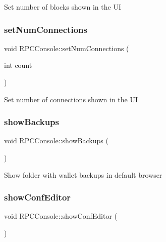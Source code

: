 Set number of blocks shown in the UI \mbox{\label{class_r_p_c_console_aa4546cb7812dd35704de8bf09a6ceb60}} 
\subsubsection{\texorpdfstring{set\+Num\+Connections}{setNumConnections}}
{\footnotesize\ttfamily void R\+P\+C\+Console\+::set\+Num\+Connections (\begin{DoxyParamCaption}\item[{int}]{count }\end{DoxyParamCaption})\hspace{0.3cm}{\ttfamily [slot]}}

Set number of connections shown in the UI \mbox{\label{class_r_p_c_console_a013ee20b746b6453375738e7b5e1cb4e}} 
\subsubsection{\texorpdfstring{show\+Backups}{showBackups}}
{\footnotesize\ttfamily void R\+P\+C\+Console\+::show\+Backups (\begin{DoxyParamCaption}{ }\end{DoxyParamCaption})\hspace{0.3cm}{\ttfamily [slot]}}

Show folder with wallet backups in default browser \mbox{\label{class_r_p_c_console_ab7e647de183fc0d139bac81ed0492667}} 
\subsubsection{\texorpdfstring{show\+Conf\+Editor}{showConfEditor}}
{\footnotesize\ttfamily void R\+P\+C\+Console\+::show\+Conf\+Editor (\begin{DoxyParamCaption}{ }\end{DoxyParamCaption})\hspace{0.3cm}{\ttfamily [slot]}}

